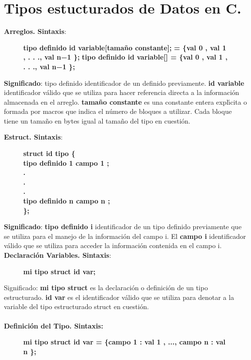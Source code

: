 \documentclass[a4paper]{article}
\begin{document}
\section{Tipos estucturados de Datos en C.}
\textbf{Arreglos. Sintaxis}:

\begin{figure}[H]
\centering
\textbf{tipo definido id variable[tamaño constante];}
\textbf{= \{val 0 , val 1 , . . ., val n−1 \};}
\textbf{tipo definido id variable[] = \{val 0 , val 1 , . . ., val n−1 \};}
\end{figure} 

\textbf{Significado}: tipo definido identificador de un definido previamente. \textbf{id variable} identificador válido que se utiliza para hacer referencia directa a la información almacenada en el arreglo. \textbf{tamaño constante} es una constante entera explı́cita o formada por macros que indica el número de bloques a utilizar. Cada bloque tiene un tamaño en bytes igual al tamaño del tipo en cuestión. \\ 
\pagebreak 

\textbf{Estruct. Sintaxis}:
\begin{figure}[H]
\centering
	\textbf{struct id tipo \{}\\ 
	\textbf{tipo definido 1 campo 1 ;} \\ 
	\textbf{.}\\ 
	\textbf{.}\\ 
	\textbf{.}\\ 
	\textbf{tipo definido n campo n ;}\\ 
	\textbf{ \}; }\\
\end{figure}

\textbf{Significado}: \textbf{tipo definido i} identificador de un tipo definido previamente que se utiliza para el manejo de la información del campo i. El \textbf{campo i} identificador válido que se utiliza para acceder la información contenida en el campo i.\\ 
\textbf{Declaración Variables. Sintaxis}:
\begin{figure}[H]
\centering
	\textbf{mi tipo struct id var;}
\end{figure}

Significado: \textbf{mi tipo struct} es la declaración o definición de un tipo
estructurado. \textbf{id var} es el identificador válido que se utiliza para denotar a la variable del tipo estructurado struct en cuestión.\\
\\ \textbf{Definición del Tipo. Sintaxis:} 
	\begin{figure}[H]
		\centering
	\textbf{mi tipo struct id var = \{campo 1 : val 1 , ..., campo n : val n \};}
	\end{figure}
\end{document}
